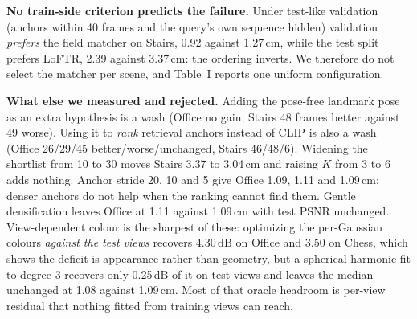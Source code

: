 \documentclass[journal]{IEEEtran}
\begin{document}
\textbf{No train-side criterion predicts the failure.} Under test-like
validation (anchors within 40 frames and the query's own sequence hidden)
validation \emph{prefers} the field matcher on Stairs, 0.92 against 1.27\,cm,
while the test split prefers LoFTR, 2.39 against 3.37\,cm: the ordering
inverts. We therefore do not select the matcher per scene, and Table~I reports
one uniform configuration.

\textbf{What else we measured and rejected.} Adding the pose-free landmark
pose as an extra hypothesis is a wash (Office no gain; Stairs 48 frames better
against 49 worse). Using it to \emph{rank} retrieval anchors instead of CLIP is
also a wash (Office 26/29/45 better/worse/unchanged, Stairs 46/48/6).
Widening the shortlist from 10 to 30 moves Stairs 3.37 to 3.04\,cm and raising
$K$ from 3 to 6 adds nothing. Anchor stride 20, 10 and 5 give Office 1.09,
1.11 and 1.09\,cm: denser anchors do not help when the ranking cannot find
them. Gentle densification leaves Office at 1.11 against 1.09\,cm with test
PSNR unchanged. View-dependent colour is the sharpest of these: optimizing the
per-Gaussian colours \emph{against the test views} recovers 4.30\,dB on Office
and 3.50 on Chess, which shows the deficit is appearance rather than geometry,
but a spherical-harmonic fit to degree 3 recovers only 0.25\,dB of it on test
views and leaves the median unchanged at 1.08 against 1.09\,cm. Most of that
oracle headroom is per-view residual that nothing fitted from training views
can reach.
\end{document}
